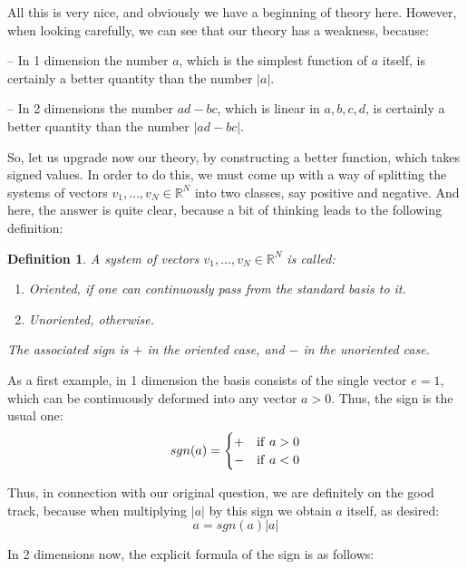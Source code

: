 \documentclass[12pt]{amsbook}
\newtheorem{definition}[theorem]{Definition}
\begin{document}
All this is very nice, and obviously we have a beginning of theory here. However, when looking carefully, we can see that our theory has a weakness, because:

\medskip

-- In 1 dimension the number $a$, which is the simplest function of $a$ itself, is certainly a better quantity than the number $|a|$.

\medskip

-- In 2 dimensions the number $ad-bc$, which is linear in $a,b,c,d$, is certainly a better quantity than the number $|ad-bc|$.

\medskip

So, let us upgrade now our theory, by constructing a better function, which takes signed values. In order to do this, we must come up with a way of splitting the systems of vectors $v_1,\ldots,v_N\in\mathbb R^N$ into two classes, say positive and negative. And here, the answer is quite clear, because a bit of thinking leads to the following definition:


\begin{definition}
A system of vectors $v_1,\ldots,v_N\in\mathbb R^N$ is called:
\begin{enumerate}
\item Oriented, if one can continuously pass from the standard basis to it.

\item Unoriented, otherwise.
\end{enumerate}
The associated sign is $+$ in the oriented case, and $-$ in the unoriented case. 
\end{definition}

As a first example, in 1 dimension the basis consists of the single vector $e=1$, which can be continuously deformed into any vector $a>0$. Thus, the sign is the usual one:
$$sgn(a)=
\begin{cases}
+&{\rm if}\ a>0\\
-&{\rm if}\ a<0
\end{cases}$$

Thus, in connection with our original question, we are definitely on the good track, because when multiplying $|a|$ by this sign we obtain $a$ itself, as desired:
$$a=sgn(a)|a|$$

In 2 dimensions now, the explicit formula of the sign is as follows:
\end{document}
